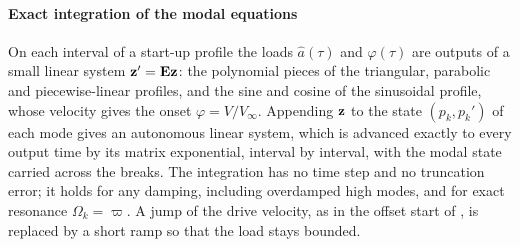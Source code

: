 \paragraph{Exact integration of the modal equations} On each interval of a start-up
profile the loads $\hat a(\tau)$ and $\varphi(\tau)$ are outputs of a small linear
system $\mathbf{z}'=\mathbf{E}\mathbf{z}$: the polynomial pieces of the triangular, parabolic and
piecewise-linear profiles, and the sine and cosine of the sinusoidal profile, whose
velocity gives the onset $\varphi=V/V_\infty$. Appending $\mathbf{z}$ to the state
$(p_k,p_k')$ of each mode gives an autonomous linear system, which is advanced exactly
to every output time by its matrix exponential, interval by interval, with the modal
state carried across the breaks. The integration has no time step and no truncation
error; it holds for any damping, including overdamped high modes, and for exact
resonance $\Omega_k=\varpi$. A jump of the drive velocity, as in the offset start of
\citet{lodewijks1996}, is replaced by a short ramp so that the load stays bounded.

